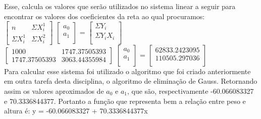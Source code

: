 \documentclass{article}
\begin{document}
    Esse, calcula os valores que serão utilizados no sistema linear a seguir para encontrar os valores dos coeficientes da reta ao qual procuramos:\\
    $\begin{bmatrix}
        n & \Sigma X_i^1\\
        \Sigma X_i^1 & \Sigma X_i^2
    \end{bmatrix}$
    $\begin{bmatrix}
        a_0\\
        a_1\\
    \end{bmatrix}$
    = $\begin{bmatrix}
        \Sigma Y_i\\
        \Sigma Y_iX_i\\
    \end{bmatrix}$\\
    $\begin{bmatrix}
        1000 & 1747.37505393\\
        1747.37505393 & 3063.44355984
    \end{bmatrix}$
    $\begin{bmatrix}
        a_0\\
        a_1\\
    \end{bmatrix}$
    = $\begin{bmatrix}
        62833.2423095\\
        110505.297036\\
    \end{bmatrix}$\\
    
    Para calcular esse sistema foi utilizado o algoritmo que foi criado anteriormente em outra tarefa desta disciplina, o algoritmo de eliminação de Gauss. Retornando assim os valores aproximados de $a_0$ e $a_1$, que são, respectivamente -60.066083327 e 70.3336844377. Portanto a função que representa bem a relação entre peso e altura é: y = -60.066083327 + 70.3336844377x
    
\end{document}
